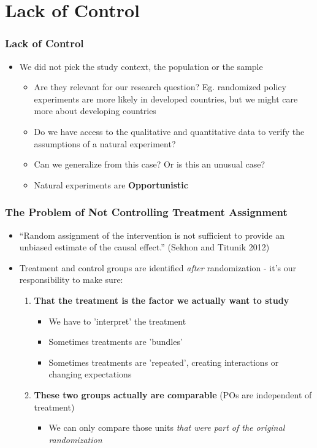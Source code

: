 \documentclass[xcolor=x11names,compress]{beamer}\usepackage[]{graphicx}\usepackage[]{color}
\renewcommand{\(}{\begin{columns}}
\renewcommand{\)}{\end{columns}}
\newcommand{\<}[1]{\begin{column}{#1}}
\renewcommand{\>}{\end{column}}
\begin{document}
\section{Lack of Control}

\begin{frame}
\frametitle{Lack of Control}
\begin{itemize}
\item We did not pick the study context, the population or the sample
\pause
\begin{itemize}
\item Are they relevant for our research question? Eg. randomized policy experiments are more likely in developed countries, but we might care more about developing countries
\pause
\item Do we have access to the qualitative and quantitative data to verify the assumptions of a natural experiment?
\pause
\item Can we generalize from this case? Or is this an unusual case?
\pause
\item Natural experiments are \textbf{Opportunistic}
\end{itemize}
\end{itemize}
\end{frame}

\begin{frame}
\frametitle{The Problem of Not Controlling Treatment Assignment}
\begin{itemize}
\item ``Random assignment of the intervention is not sufficient to provide an unbiased estimate of the causal effect.'' (Sekhon and Titunik 2012)
\pause
\item Treatment and control groups are identified \textit{after} randomization - it's our responsibility to make sure:
\pause
\begin{enumerate}
\item \textbf{That the treatment is the factor we actually want to study}
\pause
\begin{itemize}
\item We have to 'interpret' the treatment
\pause
\item Sometimes treatments are 'bundles'
\pause
\item Sometimes treatments are 'repeated', creating interactions or changing expectations
\end{itemize}
\item \textbf{These two groups actually are comparable} (POs are independent of treatment)
\pause
\begin{itemize}
\item We can only compare those units \textit{that were part of the original randomization}
\end{itemize}
\end{enumerate}
\end{itemize}
\end{frame}
\end{document}
